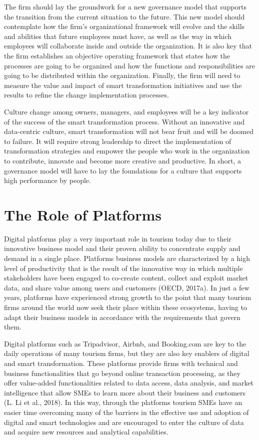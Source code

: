 \documentclass[
  letterpaper,
  DIV=11,
  numbers=noendperiod]{scrreprt}
\begin{document}
The firm should lay the groundwork for a new governance model that
supports the transition from the current situation to the future. This
new model should contemplate how the firm's organizational framework
will evolve and the skills and abilities that future employees must
have, as well as the way in which employees will collaborate inside and
outside the organization. It is also key that the firm establishes an
objective operating framework that states how the processes are going to
be organized and how the functions and responsibilities are going to be
distributed within the organization. Finally, the firm will need to
measure the value and impact of smart transformation initiatives and use
the results to refine the change implementation processes.

Culture change among owners, managers, and employees will be a key
indicator of the success of the smart transformation process. Without an
innovative and data-centric culture, smart transformation will not bear
fruit and will be doomed to failure. It will require strong leadership
to direct the implementation of transformation strategies and empower
the people who work in the organization to contribute, innovate and
become more creative and productive. In short, a governance model will
have to lay the foundations for a culture that supports high performance
by people.

\hypertarget{the-role-of-platforms}{%
\section{The Role of Platforms}\label{the-role-of-platforms}}

Digital platforms play a very important role in tourism today due to
their innovative business model and their proven ability to concentrate
supply and demand in a single place. Platforms business models are
characterized by a high level of productivity that is the result of the
innovative way in which multiple stakeholders have been engaged to
co-create content, collect and exploit market data, and share value
among users and customers (OECD, 2017a). In just a few years, platforms
have experienced strong growth to the point that many tourism firms
around the world now seek their place within these ecosystems, having to
adapt their business models in accordance with the requirements that
govern them.

Digital platforms such as Tripadvisor, Airbnb, and Booking.com are key
to the daily operations of many tourism firms, but they are also key
enablers of digital and smart transformation. These platforms provide
firms with technical and business functionalities that go beyond online
transaction processing, as they offer value-added functionalities
related to data access, data analysis, and market intelligence that
allow SMEs to learn more about their business and customers (L. Li et
al., 2018). In this way, through the platforms tourism SMEs have an
easier time overcoming many of the barriers in the effective use and
adoption of digital and smart technologies and are encouraged to enter
the culture of data and acquire new resources and analytical
capabilities.
\end{document}
